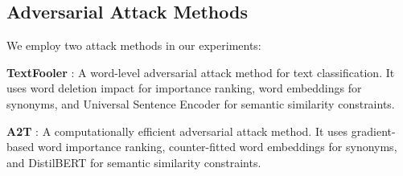 \documentclass{article}
\begin{document}

\subsection{Adversarial Attack Methods}
We employ two attack methods in our experiments:

\textbf{TextFooler} \cite{jin2020bert}: A word-level adversarial attack method for text classification. It uses word deletion impact for importance ranking, word embeddings for synonyms, and Universal Sentence Encoder for semantic similarity constraints.

\textbf{A2T} \cite{yoo2021towards}: A computationally efficient adversarial attack method. It uses gradient-based word importance ranking, counter-fitted word embeddings for synonyms, and DistilBERT for semantic similarity constraints.
\end{document}
